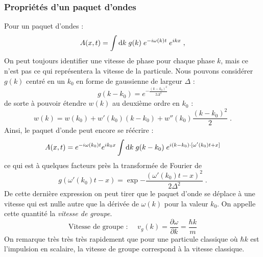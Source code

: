 \subsubsection{Propriétés d'un paquet d'ondes}
Pour un paquet d'ondes :
$$A(x, t) = \int \mathrm{d} k \; g(k) \; e^{-i\omega(k) t} \; e^{ikx} \; ,$$
On peut toujours identifier une vitesse de phase pour chaque phase $k$, mais ce n'est pas ce qui représentera la vitesse de la particule. Nous pouvons considérer $g(k)$ centré en un $k_0$ en forme de gaussienne de largeur $\Delta$ :
$$g(k-k_0) = e^{-\frac{(k-k_0)^2}{2\Delta^2}}$$
de sorte à pouvoir étendre $w(k)$ au deuxième ordre en $k_0$ :
$$ w(k) = w(k_0) + w'(k_0) (k-k_0) + w''(k_0) \frac{(k-k_0)^2}{2} \; .$$
Ainsi, le paquet d'onde peut encore se réécrire :
\begin{equation}
A(x,t) = e^{-i\omega(k_0)t} e^{ik_0x} \int \mathrm{d} k \; g(k-k_0) \; e^{i(k-k_0)\cdot [\omega'(k_0) t + x]}
\end{equation}
ce qui est à quelques facteurs près la transformée de Fourier de $$g(\omega'(k_0)t-x) = \exp{-\dfrac{(\omega'(k_0)t-x)^2}{2\Delta^2}} \; .$$
De cette dernière expression on peut tirer que le paquet d'onde se déplace à une vitesse qui est nulle autre que la dérivée de $\omega(k)$ pour la valeur $k_0$. On appelle cette quantité la \textit{vitesse de groupe}.
\begin{equation}
\boxed{
\text{Vitesse de groupe : } \quad v_g(k) = \dfrac{\partial \omega}{\partial k} = \dfrac{\hbar k}{m}
}
\end{equation}
On remarque très très très rapidement que pour une particule classique où $\hbar k$ est l'impulsion en scalaire, la vitesse de groupe correspond à la vitesse classique.

